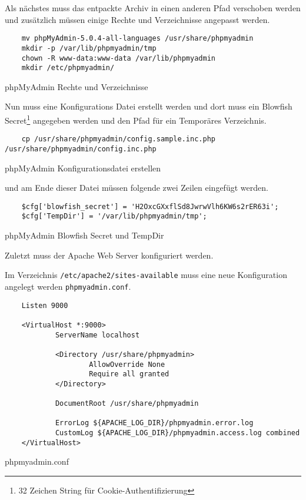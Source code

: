 Als nächstes muss das entpackte Archiv in einen anderen Pfad verschoben werden
und zusätzlich müssen einige Rechte und Verzeichnisse angepasst werden.

\begin{listing}[H]
  \begin{verbatim}
    mv phpMyAdmin-5.0.4-all-languages /usr/share/phpmyadmin
    mkdir -p /var/lib/phpmyadmin/tmp
    chown -R www-data:www-data /var/lib/phpmyadmin
    mkdir /etc/phpmyadmin/
  \end{verbatim}
  \caption{phpMyAdmin Rechte und Verzeichnisse}
\end{listing}

Nun muss eine Konfigurations Datei erstellt werden und dort muss ein Blowfish
Secret\footnote{32 Zeichen String für Cookie-Authentifizierung} angegeben werden
und den Pfad für ein Temporäres Verzeichnis.

\begin{listing}[H]
  \begin{verbatim}
    cp /usr/share/phpmyadmin/config.sample.inc.php /usr/share/phpmyadmin/config.inc.php
  \end{verbatim}
  \caption{phpMyAdmin Konfigurationsdatei erstellen}
\end{listing}

und am Ende dieser Datei müssen folgende zwei Zeilen eingefügt werden.

\begin{listing}[H]
  \begin{verbatim}
    $cfg['blowfish_secret'] = 'H2OxcGXxflSd8JwrwVlh6KW6s2rER63i'; 
    $cfg['TempDir'] = '/var/lib/phpmyadmin/tmp';
  \end{verbatim}
  \caption{phpMyAdmin Blowfish Secret und TempDir}
\end{listing}

Zuletzt muss der Apache Web Server konfiguriert werden.

Im Verzeichnis \verb|/etc/apache2/sites-available| muss eine neue Konfiguration
angelegt werden \verb|phpmyadmin.conf|.

\begin{listing}[H]
  \begin{verbatim}
    Listen 9000

    <VirtualHost *:9000>
            ServerName localhost
    
            <Directory /usr/share/phpmyadmin>
                    AllowOverride None
                    Require all granted
            </Directory>
    
            DocumentRoot /usr/share/phpmyadmin
    
            ErrorLog ${APACHE_LOG_DIR}/phpmyadmin.error.log
            CustomLog ${APACHE_LOG_DIR}/phpmyadmin.access.log combined
    </VirtualHost>
  \end{verbatim}
  \caption{phpmyadmin.conf}
\end{listing}

